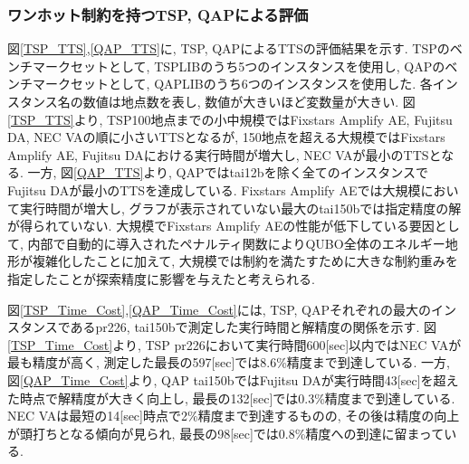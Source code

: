 \documentclass[submit,techrep,noauthor]{ipsj}
\begin{document}
\subsubsection{ワンホット制約を持つTSP, QAPによる評価}

図\ref{TSP_TTS},\ref{QAP_TTS}に, TSP, QAPによるTTSの評価結果を示す. TSPのベンチマークセットとして, TSPLIB\cite{tsplib}のうち5つのインスタンスを使用し, QAPのベンチマークセットとして, QAPLIB\cite{qaplib}のうち6つのインスタンスを使用した. 各インスタンス名の数値は地点数を表し, 数値が大きいほど変数量が大きい. 図\ref{TSP_TTS}より, TSP100地点までの小中規模ではFixstars Amplify AE, Fujitsu DA, NEC VAの順に小さいTTSとなるが, 150地点を超える大規模ではFixstars Amplify AE, Fujitsu DAにおける実行時間が増大し, NEC VAが最小のTTSとなる. 一方, 図\ref{QAP_TTS}より, QAPではtai12bを除く全てのインスタンスでFujitsu DAが最小のTTSを達成している. Fixstars Amplify AEでは大規模において実行時間が増大し, グラフが表示されていない最大のtai150bでは指定精度の解が得られていない. 大規模でFixstars Amplify AEの性能が低下している要因として, 内部で自動的に導入されたペナルティ関数によりQUBO全体のエネルギー地形が複雑化したことに加えて, 大規模では制約を満たすために大きな制約重みを指定したことが探索精度に影響を与えたと考えられる. 

図\ref{TSP_Time_Cost},\ref{QAP_Time_Cost}には, TSP, QAPそれぞれの最大のインスタンスであるpr226, tai150bで測定した実行時間と解精度の関係を示す. 図\ref{TSP_Time_Cost}より, TSP pr226において実行時間600[sec]以内ではNEC VAが最も精度が高く, 測定した最長の597[sec]では8.6\%精度まで到達している. 一方, 図\ref{QAP_Time_Cost}より, QAP tai150bではFujitsu DAが実行時間43[sec]を超えた時点で解精度が大きく向上し, 最長の132[sec]では0.3\%精度まで到達している. NEC VAは最短の14[sec]時点で2\%精度まで到達するものの, その後は精度の向上が頭打ちとなる傾向が見られ, 最長の98[sec]では0.8\%精度への到達に留まっている.
\end{document}
